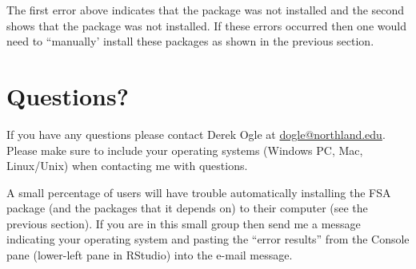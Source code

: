 \documentclass{article}\usepackage[]{graphicx}\usepackage[]{color}
\begin{document}
The first error above indicates that the  package was not installed and the second shows that the  package was not installed.  If these errors occurred then one would need to ``manually' install these packages as shown in the previous section.

\section{Questions?}
If you have any questions please contact Derek Ogle at \href{mailto:dogle@northland.edu}{dogle@northland.edu}.  Please make sure to include your operating systems (Windows PC, Mac, Linux/Unix) when contacting me with questions.

A small percentage of users will have trouble automatically installing the FSA package (and the packages that it depends on) to their computer (see the previous section).  If you are in this small group then send me a message indicating your operating system and pasting the ``error results'' from the Console pane (lower-left pane in RStudio) into the e-mail message.
\end{document}
